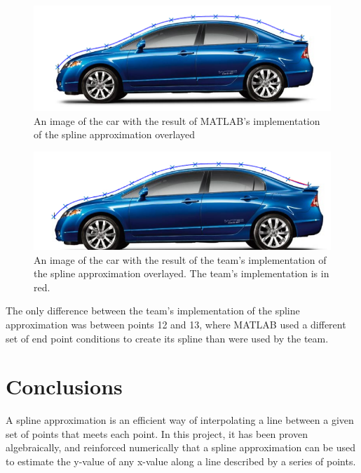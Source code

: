 \documentclass[12pt, letterpaper]{article} %
\begin{document}
\begin{center}
	\begin{figure}[H]
		\includegraphics[scale=0.5]{car_with_matlab_spline.png}
		\caption{An image of the car with the result of MATLAB's implementation of the spline approximation 			overlayed}
	\end{figure}
\end{center}

\begin{center}
	\begin{figure}[H]
		\includegraphics[scale=0.5]{car_with_both_splines.png}
		\caption{An image of the car with the result of the team's implementation of the spline approximation 		overlayed. The team's implementation is in red.}
	\end{figure}
\end{center}

The only difference between the team's implementation of the spline approximation was between points 12 and 13, where MATLAB used a different set of end point conditions to create its spline than were used by the team.

\section{Conclusions}
A spline approximation is an efficient way of interpolating a line between a given set of points that meets each point. In this project, it has been proven algebraically, and reinforced numerically that a spline approximation can be used to estimate the y-value of any x-value along a line described by a series of points.
\end{document}
